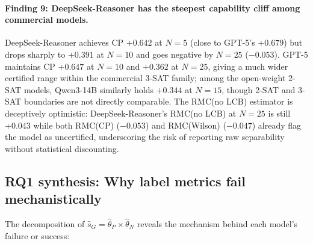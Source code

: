 \documentclass[conference]{IEEEtran}
\theoremstyle{remark}
\newcommand{\thetaP}{\hat{\theta}_P}
\newcommand{\thetaN}{\hat{\theta}_N}
\newcommand{\shat}{\hat{s}_G}
\begin{document}
\paragraph{Finding 9: DeepSeek-Reasoner has the steepest capability cliff among commercial models.}
DeepSeek-Reasoner achieves CP $+0.642$ at $N=5$ (close to GPT-5's $+0.679$) but drops sharply to $+0.391$ at $N=10$ and goes negative by $N=25$ ($-0.053$).
GPT-5 maintains CP $+0.647$ at $N=10$ and $+0.362$ at $N=25$, giving a much wider certified range within the commercial 3-SAT family; among the open-weight 2-SAT models, Qwen3-14B similarly holds $+0.344$ at $N=15$, though 2-SAT and 3-SAT boundaries are not directly comparable.
The RMC(no LCB) estimator is deceptively optimistic: DeepSeek-Reasoner's RMC(no LCB) at $N=25$ is still $+0.043$ while both RMC(CP) ($-0.053$) and RMC(Wilson) ($-0.047$) already flag the model as uncertified, underscoring the risk of reporting raw separability without statistical discounting.

\subsection{RQ1 synthesis: Why label metrics fail mechanistically}
\label{sec:bias}

The decomposition of $\shat = \thetaP\times\thetaN$ reveals the mechanism behind each model's failure or success:
\end{document}
